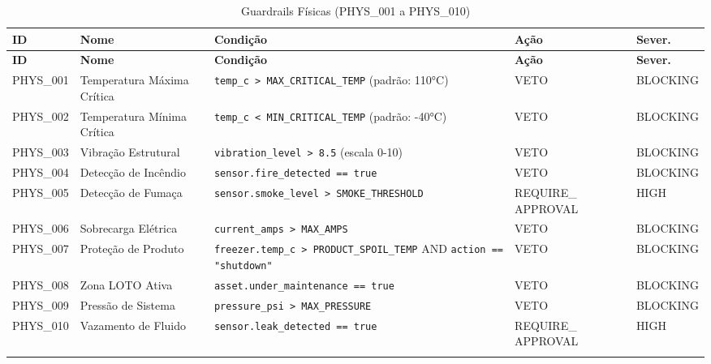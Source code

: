 \documentclass[12pt, a4paper]{article}
\begin{document}
{\small
\begin{longtable}{|p{2cm}|p{2.8cm}|p{5.5cm}|p{2cm}|p{2cm}|}
\hline
\textbf{ID} & \textbf{Nome} & \textbf{Condição} & \textbf{Ação} & \textbf{Sever.} \\ \hline
\endfirsthead
\hline
\textbf{ID} & \textbf{Nome} & \textbf{Condição} & \textbf{Ação} & \textbf{Sever.} \\ \hline
\endhead

PHYS\_001 & Temperatura Máxima Crítica & \texttt{temp\_c > MAX\_CRITICAL\_TEMP} (padrão: 110°C) & VETO & BLOCKING \\ \hline

PHYS\_002 & Temperatura Mínima Crítica & \texttt{temp\_c < MIN\_CRITICAL\_TEMP} (padrão: -40°C) & VETO & BLOCKING \\ \hline

PHYS\_003 & Vibração Estrutural & \texttt{vibration\_level > 8.5} (escala 0-10) & VETO & BLOCKING \\ \hline

PHYS\_004 & Detecção de Incêndio & \texttt{sensor.fire\_detected == true} & VETO & BLOCKING \\ \hline

PHYS\_005 & Detecção de Fumaça & \texttt{sensor.smoke\_level > SMOKE\_THRESHOLD} & REQUIRE\_ APPROVAL & HIGH \\ \hline

PHYS\_006 & Sobrecarga Elétrica & \texttt{current\_amps > MAX\_AMPS} & VETO & BLOCKING \\ \hline

PHYS\_007 & Proteção de Produto & \texttt{freezer.temp\_c > PRODUCT\_SPOIL\_TEMP} AND \texttt{action == "shutdown"} & VETO & BLOCKING \\ \hline

PHYS\_008 & Zona LOTO Ativa & \texttt{asset.under\_maintenance == true} & VETO & BLOCKING \\ \hline

PHYS\_009 & Pressão de Sistema & \texttt{pressure\_psi > MAX\_PRESSURE} & VETO & BLOCKING \\ \hline

PHYS\_010 & Vazamento de Fluido & \texttt{sensor.leak\_detected == true} & REQUIRE\_ APPROVAL & HIGH \\ \hline

\caption{Guardrails Físicas (PHYS\_001 a PHYS\_010)}
\end{longtable}
}

\end{document}
